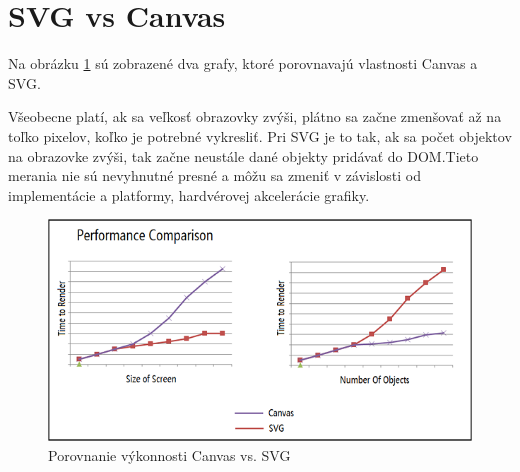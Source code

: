 \clearpage






\section{SVG vs Canvas}






Na obrázku \ref{fig:podpora23} sú zobrazené dva grafy, ktoré porovnavajú vlastnosti Canvas a SVG. 


Všeobecne platí, ak sa veľkosť obrazovky zvýši, plátno sa začne zmenšovať až na toľko pixelov, koľko je potrebné vykresliť. Pri SVG je to tak, ak sa počet objektov na obrazovke zvýši, tak začne neustále dané objekty pridávať do DOM.Tieto merania nie sú nevyhnutné presné a môžu sa zmeniť v závislosti od implementácie a platformy, hardvérovej akcelerácie grafiky. \cite{microsoft}


 \begin{figure}[H]
\centering
\includegraphics[width=1\linewidth]{obrazky/porovnanie}
\caption{Porovnanie výkonnosti Canvas vs. SVG}
\label{fig:podpora23}
\end{figure}







